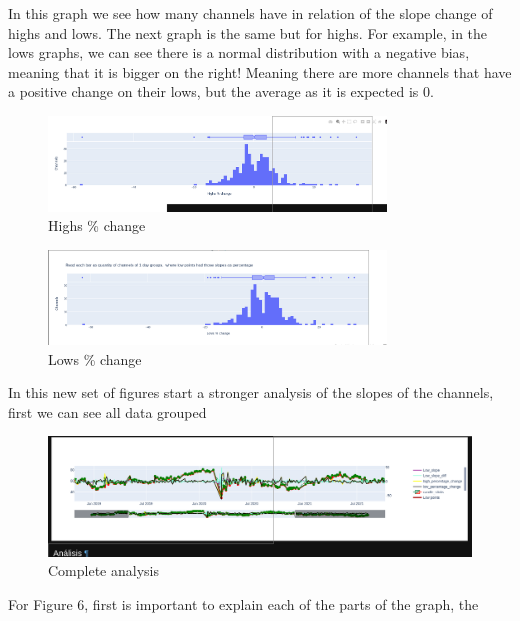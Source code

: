 \documentclass{article}
\begin{document}
In this graph we see  how many channels have in relation of the slope change of
highs and lows. The next graph is the same but for highs. For example, in the
lows graphs, we can see there is a normal distribution with a negative bias,
meaning that it is bigger on the right! Meaning there are more channels that
have a positive change on their lows, but the average as it is expected is 0.
\begin{figure}[h]
  \caption{Highs \% change}
  \begin{center}
    \includegraphics[width=0.8\textwidth]{figures/5.png}
  \end{center}
\end{figure}
\begin{figure}[h]
  \caption{Lows \% change}
  \begin{center}
    \includegraphics[width=0.8\textwidth]{figures/4.png}
  \end{center}
\end{figure}
\newpage
In this new set of figures start a stronger analysis of the slopes of the
channels, first we can see all data grouped
\begin{figure}[h]
  \caption{Complete analysis}
  \begin{center}
    \includegraphics[width=1\textwidth]{figures/2023-05-25-143714_1475x420_scrot.png}
  \end{center}
\end{figure}
For Figure 6, first is important to explain each of the parts of the graph, the
\end{document}
